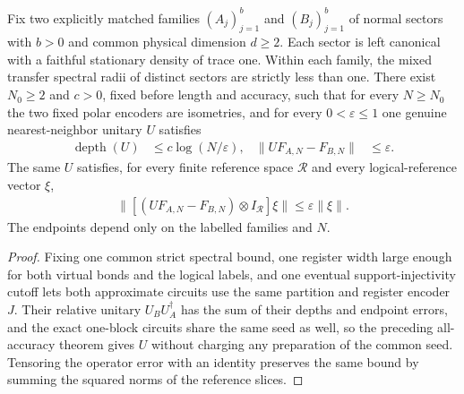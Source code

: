 \begin{lemma}
    \label{thm:ldp_coherent_groundspace_conversion}
    \leanok
    Fix two explicitly matched families $(A_j)_{j=1}^b$ and
    $(B_j)_{j=1}^b$ of normal sectors with $b>0$ and common physical
    dimension $d\ge2$. Each sector is left canonical with a faithful
    stationary density of trace one. Within each family, the mixed
    transfer spectral radii of distinct sectors are strictly less than one.
    There exist $N_0\ge2$ and $c>0$, fixed before length and accuracy,
    such that for every $N\ge N_0$ the two fixed polar encoders are
    isometries, and for every $0<\varepsilon\le1$ one genuine
    nearest-neighbor unitary $U$ satisfies
    \begin{align*}
        \operatorname{depth}(U) & \le c\log(N/\varepsilon), &
        \|UF_{A,N}-F_{B,N}\|    & \le\varepsilon.
    \end{align*}
    The same $U$ satisfies, for every finite reference space $\mathcal R$
    and every logical-reference vector $\xi$,
    \begin{align*}
        \|[(UF_{A,N}-F_{B,N})\otimes I_{\mathcal R}]\xi\|
        \le\varepsilon\|\xi\|.
    \end{align*}
    The endpoints depend only on the labelled families and $N$.
\end{lemma}
\begin{proof}\leanok
    Fixing one common strict spectral bound, one register width large
    enough for both virtual bonds and the logical labels, and one
    eventual support-injectivity cutoff lets both approximate circuits use
    the same partition and register encoder $J$. Their relative unitary
    $U_BU_A^\dagger$ has the sum of their depths and endpoint errors, and
    the exact one-block circuits share the same seed as well, so the
    preceding all-accuracy theorem gives $U$ without charging any preparation of the common seed. Tensoring the operator error with an
    identity preserves the same bound by summing the squared norms of the reference
    slices.
\end{proof}


